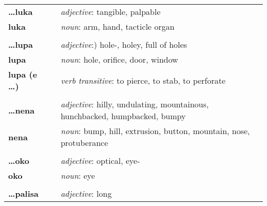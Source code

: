\begin{supertabular}{p{2,5cm}|ll}
    \textbf{\dots luka}       &  & \textit{adjective}: tangible, palpable                                                      \\ %
    \textbf{luka}             &  & \textit{noun}: arm, hand, tacticle organ                                                    \\ %
                              &  &                                                                                             \\ %
    \textbf{\dots lupa}       &  & \textit{adjective}:) hole-, holey, full of holes                                            \\ %
    \textbf{lupa}             &  & \textit{noun}: hole, orifice, door, window                                                  \\ %
    \textbf{lupa (e \dots)}   &  & \textit{verb transitive}: to pierce, to stab, to perforate                                  \\ %
                              &  &                                                                                             \\ %
    \textbf{\dots nena}       &  & \textit{adjective}: hilly, undulating, mountainous, hunchbacked, humpbacked, bumpy          \\ %
    \textbf{nena}             &  & \textit{noun}: bump, hill, extrusion, button, mountain, nose, protuberance                  \\ %
                              &  &                                                                                             \\ %
    \textbf{\dots oko}        &  & \textit{adjective}: optical, eye-                                                           \\ %
    \textbf{oko}              &  & \textit{noun}: eye                                                                          \\ %
                              &  &                                                                                             \\ %
    \textbf{\dots palisa}     &  & \textit{adjective}: long                                                                    \\ %

\end{supertabular}
